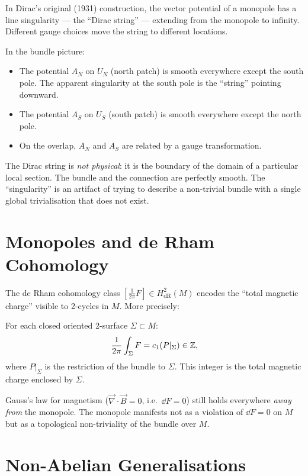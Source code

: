 In Dirac's original (1931) construction, the vector potential of a monopole has a line singularity --- the ``Dirac string'' --- extending from the monopole to infinity. Different gauge choices move the string to different locations.

In the bundle picture:
\begin{itemize}
\item The potential $A_N$ on $U_N$ (north patch) is smooth everywhere except the south pole. The apparent singularity at the south pole is the ``string'' pointing downward.
\item The potential $A_S$ on $U_S$ (south patch) is smooth everywhere except the north pole.
\item On the overlap, $A_N$ and $A_S$ are related by a gauge transformation.
\end{itemize}

The Dirac string is \emph{not physical}: it is the boundary of the domain of a particular local section. The bundle and the connection are perfectly smooth. The ``singularity'' is an artifact of trying to describe a non-trivial bundle with a single global trivialisation that does not exist.

\section{Monopoles and de Rham Cohomology}

The de Rham cohomology class $[\tfrac{1}{2\pi}F] \in H^2_{\text{dR}}(M)$ encodes the ``total magnetic charge'' visible to 2-cycles in $M$. More precisely:

\begin{proposition}
For each closed oriented 2-surface $\Sigma \subset M$:
\begin{equation}
\frac{1}{2\pi}\int_\Sigma F = c_1(P|_\Sigma) \in \mathbb{Z},
\end{equation}
where $P|_\Sigma$ is the restriction of the bundle to $\Sigma$. This integer is the total magnetic charge enclosed by $\Sigma$.
\end{proposition}

Gauss's law for magnetism ($\vec{\nabla}\cdot\vec{B} = 0$, i.e.\ $\dd F = 0$) still holds everywhere \emph{away from} the monopole. The monopole manifests not as a violation of $\dd F = 0$ on $M$ but as a topological non-triviality of the bundle over $M$.

\section{Non-Abelian Generalisations}

